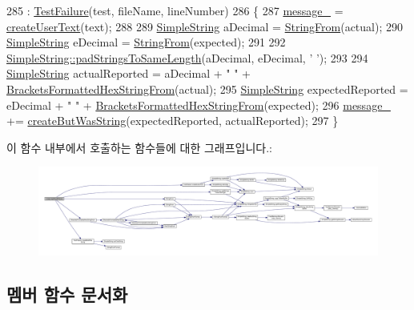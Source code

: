 \begin{DoxyCode}
285 : \hyperlink{class_test_failure_ac777aac1978181d7dfbb6be572da7341}{TestFailure}(test, fileName, lineNumber)
286 \{
287     \hyperlink{class_test_failure_af95aeab689fdb637c3e94b0c10db3e53}{message\_} = \hyperlink{class_test_failure_ae67765ada519d8a163922f50099a0016}{createUserText}(text);
288 
289     \hyperlink{class_simple_string}{SimpleString} aDecimal = \hyperlink{_simple_string_8h_a195ee4ca8d909f9ebf37e963d4564446}{StringFrom}(actual);
290     \hyperlink{class_simple_string}{SimpleString} eDecimal = \hyperlink{_simple_string_8h_a195ee4ca8d909f9ebf37e963d4564446}{StringFrom}(expected);
291 
292     \hyperlink{class_simple_string_ae697cd1c14c5ca884666fefa6a3b3af4}{SimpleString::padStringsToSameLength}(aDecimal, eDecimal, \textcolor{charliteral}{' '});
293 
294     \hyperlink{class_simple_string}{SimpleString} actualReported = aDecimal + \textcolor{stringliteral}{" "} + 
      \hyperlink{_simple_string_8h_a79aff9fc6d44ba7c6f3dc9dc764c476a}{BracketsFormattedHexStringFrom}(actual);
295     \hyperlink{class_simple_string}{SimpleString} expectedReported = eDecimal + \textcolor{stringliteral}{" "} + 
      \hyperlink{_simple_string_8h_a79aff9fc6d44ba7c6f3dc9dc764c476a}{BracketsFormattedHexStringFrom}(expected);
296     \hyperlink{class_test_failure_af95aeab689fdb637c3e94b0c10db3e53}{message\_} += \hyperlink{class_test_failure_a14e11a7282409ba8fb985ab58c983856}{createButWasString}(expectedReported, actualReported);
297 \}
\end{DoxyCode}


이 함수 내부에서 호출하는 함수들에 대한 그래프입니다.\+:
\nopagebreak
\begin{figure}[H]
\begin{center}
\leavevmode
\includegraphics[width=350pt]{class_long_longs_equal_failure_afb87d73dd92d86df271e93bc21b19bac_cgraph}
\end{center}
\end{figure}




\subsection{멤버 함수 문서화}
